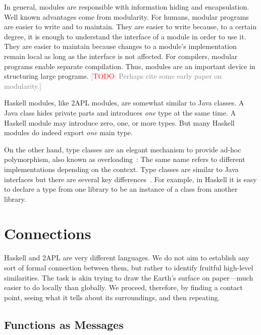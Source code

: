 \documentclass[conference,compsoc]{IEEEtran} %
\newcommand{\todo}[1]{{\small \textcolor{gray}{[\textcolor{red}{TODO}: #1]}}}
\begin{document}
In general, modules are responsible with information hiding and
encapsulation. Well known advantages come from modularity. For humans,
modular programs are easier to write and to maintain. They are easier to
write because, to a certain degree, it is enough to understand the
interface of a module in order to use it. They are easier to maintain
because changes to a module's implementation remain local as long as the
interface is not affected. For compilers, modular programs enable separate
compilation. Thus, modules are an important device in structuring large
programs. \todo{Perhaps cite some early paper on modularity.}

Haskell modules, like 2APL modules,  are somewhat similar to Java classes.
A Java class hides private parts and introduces \emph{one} type at the same
time. A Haskell module may introduce zero, one, or more types.  But many
Haskell modules do indeed export \emph{one} main type. 

On the other hand, type classes are an elegant mechanism to provide ad-hoc
polymorphism, also known as overloading~\cite{DBLP:conf/popl/WadlerB89}:
The same name refers to different implementations depending on the context.
Type classes are similar to Java interfaces but there are several key
differences~\cite{WEB:PJ-tc}. For example, in Haskell it is easy to declare
a type from one library to be an instance of a class from another library.

\section{Connections} %

Haskell and 2APL are very different languages. We do not aim to establish
any sort of formal connection between them, but rather to identify fruitful
high-level similarities. The task is akin trying to draw the Earth's
surface on paper---much easier to do locally than globally. We proceed,
therefore, by finding a contact point, seeing what it tells about its
surroundings, and then repeating.

\subsection{Functions as Messages} %
\end{document}
